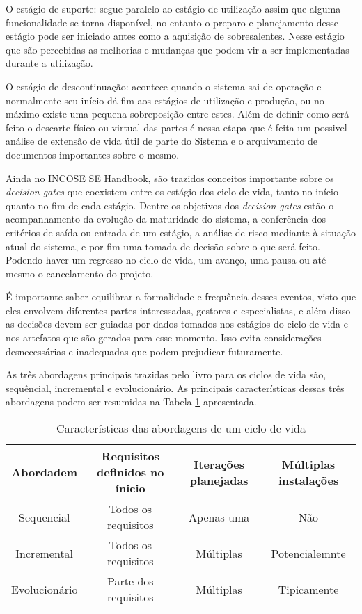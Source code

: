 	O estágio de suporte: segue paralelo ao estágio de utilização assim que alguma funcionalidade se torna disponível, no entanto o preparo e planejamento desse estágio pode 
	ser iniciado antes como a aquisição de sobresalentes. Nesse estágio que são percebidas as melhorias e mudanças que podem vir a ser implementadas durante a utilização.

	O estágio de descontinuação: acontece quando o sistema sai de operação e normalmente seu início dá fim aos estágios de utilização e produção, ou no máximo existe uma pequena
	sobreposição entre estes. Além de definir como será feito o descarte físico ou virtual das partes é nessa etapa que é feita um possivel análise de extensão de vida útil de parte do Sistema
	e o arquivamento de documentos importantes sobre o mesmo.

	Ainda no INCOSE SE Handbook, são trazidos conceitos importante sobre os \textit{decision gates} que coexistem entre os estágio dos ciclo de vida, tanto no início quanto no fim de cada estágio.
	Dentre os objetivos dos \textit{decision gates} estão o acompanhamento da evolução da maturidade do sistema, a conferência dos critérios de saída ou entrada de um estágio,
	a análise de risco mediante à situação atual do sistema, e por fim uma tomada de decisão sobre o que será feito. Podendo haver um regresso no ciclo de vida, um avanço, uma pausa 
	ou até mesmo o cancelamento do projeto.

	É importante saber equilibrar a formalidade e frequência desses eventos, visto que eles envolvem diferentes partes interessadas, gestores e especialistas, e além disso as
	decisões devem ser guiadas por dados tomados nos estágios do ciclo de vida e nos artefatos que são gerados para esse momento. Isso evita considerações desnecessárias e 
	inadequadas que podem prejudicar futuramente.

	As três abordagens principais trazidas pelo livro para os ciclos de vida são, sequêncial, incremental e evolucionário. As principais características dessas três abordagens
	podem ser resumidas na Tabela \ref{tab:revisao:ciclodevida:abordagens} apresentada.

	\begin{table}[!h]
		\centering
		\caption{Características das abordagens de um ciclo de vida}
		\begin{tabular}{cccc}
			\hline
			Abordadem & Requisitos definidos no ínicio & Iterações planejadas & Múltiplas instalações \\
			\hline
			Sequencial & Todos os requisitos & Apenas uma & Não\\
			Incremental & Todos os requisitos & Múltiplas & Potencialemnte\\
			Evolucionário & Parte dos requisitos & Múltiplas & Tipicamente\\
			\hline
		\end{tabular}
		\label{tab:revisao:ciclodevida:abordagens}
	\end{table}


